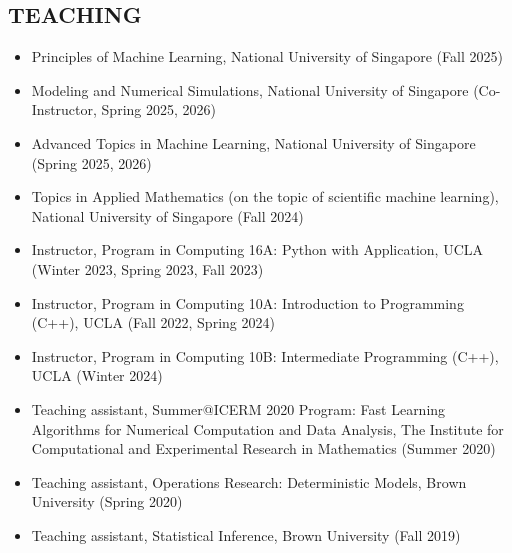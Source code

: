 \documentclass[margin]{resphoto}
\begin{document}
\begin{resume}
\section{TEACHING}
\begin{itemize}[leftmargin=*]
    \item Principles of Machine Learning, National University of Singapore 
 (Fall 2025)
     \item Modeling and Numerical Simulations, National University of Singapore 
 (Co-Instructor, Spring 2025, 2026)
    \item Advanced Topics in Machine Learning, National University of Singapore 
 (Spring 2025, 2026)
    \item Topics in Applied Mathematics (on the topic of scientific machine learning), National University of Singapore (Fall 2024)
    \item Instructor, Program in Computing 16A: Python with Application, UCLA (Winter 2023, Spring 2023, Fall 2023)
    \item Instructor, Program in Computing 10A: Introduction to Programming (C++), UCLA (Fall 2022, Spring 2024)
    \item Instructor, Program in Computing 10B: Intermediate Programming (C++), UCLA (Winter 2024)
    \item Teaching assistant, Summer@ICERM 2020 Program: Fast Learning Algorithms for Numerical Computation and Data Analysis, The Institute for Computational and Experimental Research in Mathematics (Summer 2020)
    \item Teaching assistant, Operations Research: Deterministic Models, Brown University (Spring 2020)
    \item Teaching assistant, Statistical Inference, Brown University (Fall 2019)
\end{itemize}



\end{resume}
\end{document}
